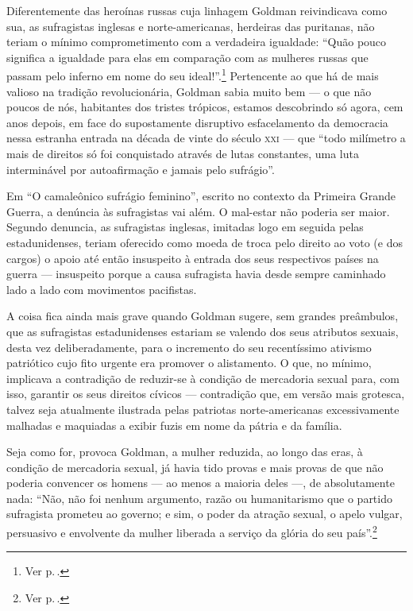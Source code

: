 Diferentemente das heroínas russas
cuja linhagem Goldman reivindicava como sua, as sufragistas inglesas e
norte-americanas, herdeiras das puritanas, não teriam o mínimo
comprometimento com a verdadeira igualdade: ``Quão pouco significa a
igualdade para elas em comparação com as mulheres russas que passam pelo
inferno em nome do seu ideal!''.\footnote{Ver p.\,\pageref{russas}.} Pertencente ao que há de mais valioso na
tradição revolucionária, Goldman sabia muito bem --- o que não poucos de
nós, habitantes dos tristes trópicos, estamos descobrindo só agora, cem
anos depois, em face do supostamente disruptivo esfacelamento da
democracia nessa estranha entrada na década de vinte do século
\textsc{xxi} --- que ``todo milímetro a mais de direitos só foi conquistado através
de lutas constantes, uma luta interminável por autoafirmação e jamais
pelo sufrágio''.

Em ``O camaleônico sufrágio feminino'', escrito no contexto da Primeira
Grande Guerra, a denúncia às sufragistas vai além. O mal-estar não
poderia ser maior. Segundo denuncia, as sufragistas inglesas, imitadas
logo em seguida pelas estadunidenses, teriam oferecido como moeda de
troca pelo direito ao voto (e dos cargos) o apoio até então insuspeito à
entrada dos seus respectivos países na guerra --- insuspeito porque
a causa sufragista havia desde sempre caminhado lado a lado com movimentos
pacifistas.

A coisa fica ainda mais grave quando
Goldman sugere, sem grandes preâmbulos,
que as sufragistas estadunidenses estariam se valendo dos seus atributos sexuais, desta vez
deliberadamente, para o incremento do seu recentíssimo ativismo
patriótico cujo fito urgente era promover o alistamento. O
que, no mínimo, implicava a contradição de reduzir-se à condição de
mercadoria sexual para, com isso, garantir os seus direitos cívicos ---
contradição que, em versão mais grotesca, talvez seja atualmente
ilustrada pelas patriotas norte-americanas excessivamente malhadas e
maquiadas a exibir fuzis em nome da pátria e da família.

Seja
como for, provoca Goldman, a mulher reduzida, ao
longo das eras, à condição de mercadoria sexual, já havia tido provas e
mais provas de que não poderia convencer os homens --- ao menos a maioria
deles ---, de absolutamente nada: ``Não, não foi nenhum argumento, razão ou humanitarismo que o partido sufragista prometeu ao governo; e sim, o poder da atração
sexual, o apelo vulgar, persuasivo e envolvente da mulher liberada a
serviço da glória do seu país''.\footnote{Ver p.\,\pageref{argumento}.}

